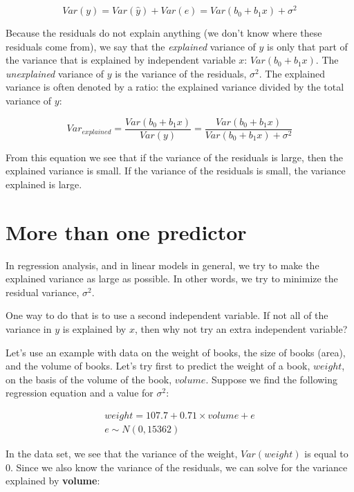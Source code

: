 \documentclass[]{report}\usepackage[]{graphicx}\usepackage[]{color}
\begin{document}
\begin{equation}
Var(y) = Var(\hat{y}) + Var(e) = Var(b_0 + b_1 x) + \sigma^2
\end{equation}


Because the residuals do not explain anything (we don't know where these residuals come from), we say that the \textit{explained} variance of $y$ is only that part of the variance that is explained by independent variable $x$: $Var(b_0 + b_1 x)$. The \textit{unexplained} variance of $y$ is the variance of the residuals, $\sigma^2$. The explained variance is often denoted by a ratio: the explained variance divided by the total variance of $y$:


\begin{equation}
Var_{explained} = \frac{Var(b_0+b_1 x)}{Var(y)} = \frac{Var(b_0+b_1 x)}{Var(b_0+b_1 x) + \sigma^2}
\end{equation}

From this equation we see that if the variance of the residuals is large, then the explained variance is small. If the variance of the residuals is small, the variance explained is large.


\section{More than one predictor}

In regression analysis, and in linear models in general, we try to make the explained variance as large as possible. In other words, we try to minimize the residual variance, $\sigma^2$.

One way to do that is to use a second independent variable. If not all of the variance in $y$ is explained by $x$, then why not try an extra independent variable?


Let's use an example with data on the weight of books, the size of books (area), and the volume of books. Let's try first to predict the weight of a book, $weight$, on the basis of the volume of the book, $volume$. Suppose we find the following regression equation and a value for $\sigma^2$:






\begin{eqnarray}
weight = 107.7 + 0.71 \times  volume + e \\
e \sim N(0, 15362)
\end{eqnarray}


In the data set, we see that the variance of the weight, $Var(weight)$ is equal to 0. Since we also know the variance of the residuals, we can solve for the variance explained by \textbf{volume}:
\end{document}
